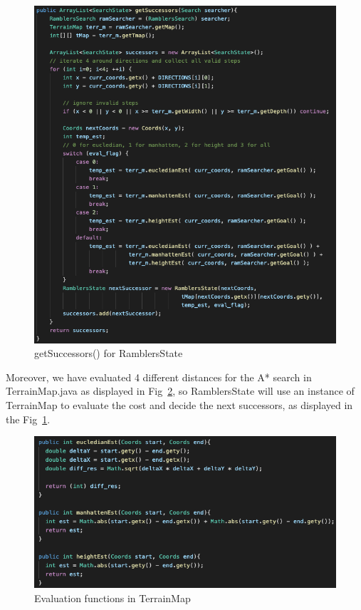 \documentclass[11pt,oneside]{article}
\begin{document}
 \begin{figure}[H]
\centering
  \includegraphics[scale=0.45]{getSuccessors.png}
  \caption{getSuccessors() for RamblersState}
  \label{fig:getsuccessor}
 \end{figure}
Moreover, we have evaluated 4 different distances for the A* search in TerrainMap.java as displayed in Fig~\ref{fig:eval_fnc}, so RamblersState will use an instance of TerrainMap to evaluate the cost and decide the next successors, as displayed in the Fig~\ref{fig:getsuccessor}.

\begin{figure}[H]
\centering
  \includegraphics[scale=0.45]{eval_fnc.png}
  \caption{Evaluation functions in TerrainMap}
  \label{fig:eval_fnc}
 \end{figure} 
 
\end{document}
